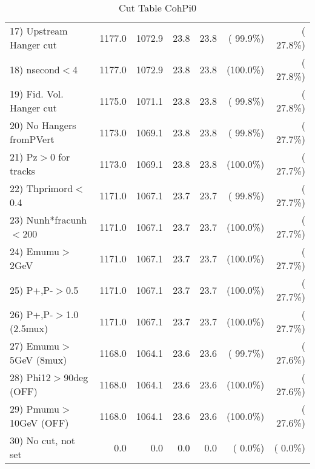 \begin{table}[h!]
\begin{tabular}{||l||r|r|r|r|r|r||}
 17) Upstream Hanger cut  &       1177.0 &       1072.9 &         23.8 &         23.8 & ( 99.9\%) & ( 27.8\%) \\
 18) nsecond$<$4          &       1177.0 &       1072.9 &         23.8 &         23.8 & (100.0\%) & ( 27.8\%) \\
 19) Fid. Vol. Hanger cut &       1175.0 &       1071.1 &         23.8 &         23.8 & ( 99.8\%) & ( 27.8\%) \\
 20) No Hangers fromPVert &       1173.0 &       1069.1 &         23.8 &         23.8 & ( 99.8\%) & ( 27.7\%) \\
 21) Pz$>$0 for tracks    &       1173.0 &       1069.1 &         23.8 &         23.8 & (100.0\%) & ( 27.7\%) \\
 22) Thprimord$<$0.4      &       1171.0 &       1067.1 &         23.7 &         23.7 & ( 99.8\%) & ( 27.7\%) \\
 23) Nunh*fracunh$<$200   &       1171.0 &       1067.1 &         23.7 &         23.7 & (100.0\%) & ( 27.7\%) \\
 24) Emumu$>$2GeV         &       1171.0 &       1067.1 &         23.7 &         23.7 & (100.0\%) & ( 27.7\%) \\
 25) P+,P-$>$0.5          &       1171.0 &       1067.1 &         23.7 &         23.7 & (100.0\%) & ( 27.7\%) \\
 26) P+,P-$>$1.0 (2.5mux) &       1171.0 &       1067.1 &         23.7 &         23.7 & (100.0\%) & ( 27.7\%) \\
 27) Emumu$>$5GeV  (8mux) &       1168.0 &       1064.1 &         23.6 &         23.6 & ( 99.7\%) & ( 27.6\%) \\
 28) Phi12$>$90deg  (OFF) &       1168.0 &       1064.1 &         23.6 &         23.6 & (100.0\%) & ( 27.6\%) \\
 29) Pmumu$>$10GeV  (OFF) &       1168.0 &       1064.1 &         23.6 &         23.6 & (100.0\%) & ( 27.6\%) \\
 30) No cut, not set      &          0.0 &          0.0 &          0.0 &          0.0 & (  0.0\%) & (  0.0\%) \\
 \hline
 \hline
 \end{tabular}
 \caption{Cut Table  CohPi0   }
 \label{tab-cutheavy_neutrino_0.500}
 \end{table}

